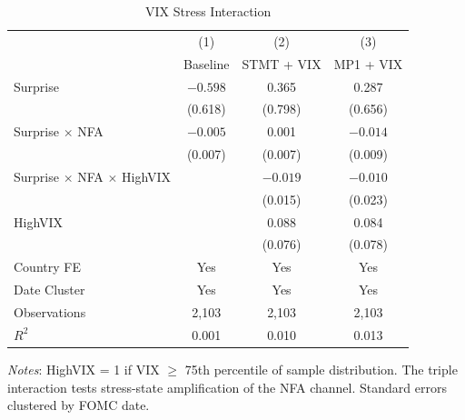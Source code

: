 \documentclass[12pt]{article}
\begin{document}
\begin{table}
\centering
\caption{VIX Stress Interaction}
\label{tab:vix_stress}
\begin{tabular}{lccc}
\toprule
 & (1) & (2) & (3) \\
 & Baseline & STMT + VIX & MP1 + VIX \\
\midrule
Surprise & $-0.598$ & 0.365 & 0.287 \\
 & (0.618) & (0.798) & (0.656) \\
Surprise $\times$ NFA & $-0.005$ & 0.001 & $-0.014$ \\
 & (0.007) & (0.007) & (0.009) \\
Surprise $\times$ NFA $\times$ HighVIX & & $-0.019$ & $-0.010$ \\
 & & (0.015) & (0.023) \\
HighVIX & & 0.088 & 0.084 \\
 & & (0.076) & (0.078) \\
\midrule
Country FE & Yes & Yes & Yes \\
Date Cluster & Yes & Yes & Yes \\
Observations & 2,103 & 2,103 & 2,103 \\
$R^2$ & 0.001 & 0.010 & 0.013 \\
\bottomrule
\end{tabular}
\begin{flushleft}
\footnotesize \textit{Notes}: HighVIX = 1 if VIX $\geq$ 75th percentile of sample distribution. The triple interaction tests stress-state amplification of the NFA channel. Standard errors clustered by FOMC date.
\end{flushleft}
\end{table}
\end{document}
